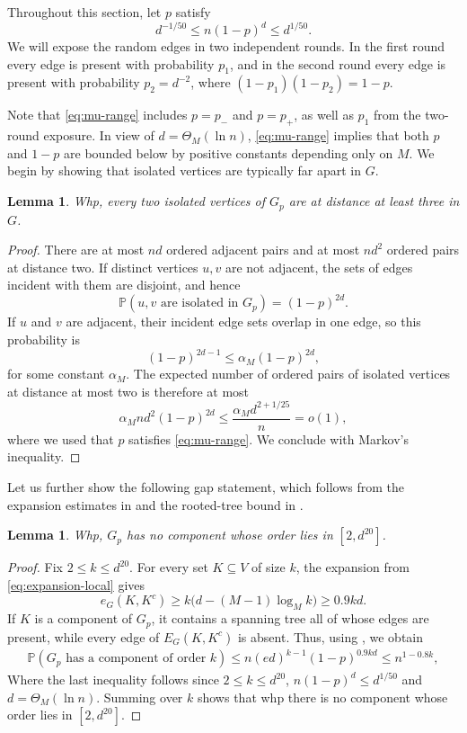 \documentclass[notitlepage]{scrartcl}
\newtheorem{lemma}[thm]{Lemma}
\begin{document}
Throughout this section, let $p$ satisfy
\begin{equation}\label{eq:mu-range}
  d^{-1/50}\le n(1-p)^d\le d^{1/50}.
\end{equation}
We will expose the random edges in two independent rounds.
In the first round every edge is present with probability $p_1$, and in the second round every edge is present with probability $p_2=d^{-2}$, where $(1-p_1)(1-p_2)=1-p$.

Note that \eqref{eq:mu-range} includes $p=p_-$ and $p=p_+$, as well as $p_1$ from the two-round exposure.
In view of $d=\Theta_M(\ln n)$, \eqref{eq:mu-range} implies that both $p$ and $1-p$ are bounded below by positive constants depending only on $M$.
We begin by showing that isolated vertices are typically far apart in $G$.

\begin{lemma}\label{lem:isolates-far}
Whp, every two isolated vertices of $G_p$ are at distance at least three in $G$.
\end{lemma}

\begin{proof}
There are at most $nd$ ordered adjacent pairs and at most $nd^2$ ordered pairs at distance two.
If distinct vertices $u,v$ are not adjacent, the sets of edges incident with them are disjoint, and hence
\[
  \mathbb{P}(u,v\text{ are isolated in }G_p)=(1-p)^{2d}.
\]
If $u$ and $v$ are adjacent, their incident edge sets overlap in one edge, so this probability is
\[
  (1-p)^{2d-1}\le \alpha_M(1-p)^{2d},
\]
for some constant $\alpha_M$.
The expected number of ordered pairs of isolated vertices at distance at most two is therefore at most
\[
  \alpha_M nd^2(1-p)^{2d}   \le \frac{\alpha_M d^{2+1/25}}{n}=o(1),
\]
where we used that $p$ satisfies \eqref{eq:mu-range}.
We conclude with Markov's inequality.
\end{proof}

Let us further show the following gap statement, which follows from the expansion estimates in  and the rooted-tree bound in .

\begin{lemma}\label{lem:component-gap}
Whp, $G_p$ has no component whose order lies in $[2,d^{20}]$.
\end{lemma}

\begin{proof}
Fix $2\le k\le d^{20}$.
For every set $K\subseteq V$ of size $k$, the expansion from \eqref{eq:expansion-local} gives
\[
  e_G(K,K^c)\ge k\bigl(d-(M-1)\log_Mk\bigr)\ge0.9kd.
\]
If $K$ is a component of $G_p$, it contains a spanning tree all of whose edges are present, while every edge of $E_G(K,K^c)$ is absent.
Thus, using , we obtain
\begin{align*}
  \mathbb{P}(G_p\text{ has a component of order }k)
  \le n(ed)^{k-1}(1-p)^{0.9kd} \le n^{1-0.8k},
\end{align*}
Where the last inequality follows since $2\le k\le d^{20}$,  $n (1-p)^d\le d^{1/50}$ and $d=\Theta_M(\ln n)$.
Summing over $k$ shows that whp there is no component whose order lies in $[2, d^{20}]$.
\end{proof}
\end{document}
